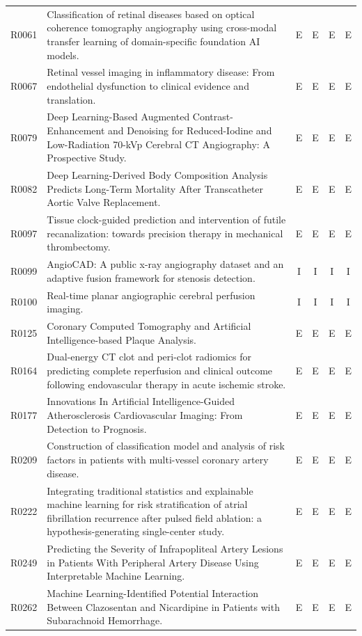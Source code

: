 \begin{longtable}{@{}l p{8.6cm} c c c c@{}}
R0061 & Classification of retinal diseases based on optical coherence tomography angiography using cross-modal transfer learning of domain-specific foundation AI models. & E & E & E & E \\
R0067 & Retinal vessel imaging in inflammatory disease: From endothelial dysfunction to clinical evidence and translation. & E & E & E & E \\
R0079 & Deep Learning-Based Augmented Contrast-Enhancement and Denoising for Reduced-Iodine and Low-Radiation 70-kVp Cerebral CT Angiography: A Prospective Study. & E & E & E & E \\
R0082 & Deep Learning-Derived Body Composition Analysis Predicts Long-Term Mortality After Transcatheter Aortic Valve Replacement. & E & E & E & E \\
R0097 & Tissue clock-guided prediction and intervention of futile recanalization: towards precision therapy in mechanical thrombectomy. & E & E & E & E \\
R0099 & AngioCAD: A public x-ray angiography dataset and an adaptive fusion framework for stenosis detection. & I & I & I & I \\
R0100 & Real-time planar angiographic cerebral perfusion imaging. & I & I & I & I \\
R0125 & Coronary Computed Tomography and Artificial Intelligence-based Plaque Analysis. & E & E & E & E \\
R0164 & Dual-energy CT clot and peri-clot radiomics for predicting complete reperfusion and clinical outcome following endovascular therapy in acute ischemic stroke. & E & E & E & E \\
R0177 & Innovations In Artificial Intelligence-Guided Atherosclerosis Cardiovascular Imaging: From Detection to Prognosis. & E & E & E & E \\
R0209 & Construction of classification model and analysis of risk factors in patients with multi-vessel coronary artery disease. & E & E & E & E \\
R0222 & Integrating traditional statistics and explainable machine learning for risk stratification of atrial fibrillation recurrence after pulsed field ablation: a hypothesis-generating single-center study. & E & E & E & E \\
R0249 & Predicting the Severity of Infrapopliteal Artery Lesions in Patients With Peripheral Artery Disease Using Interpretable Machine Learning. & E & E & E & E \\
R0262 & Machine Learning-Identified Potential Interaction Between Clazosentan and Nicardipine in Patients with Subarachnoid Hemorrhage. & E & E & E & E \\

\end{longtable}

